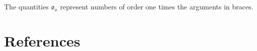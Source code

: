 \documentclass[preprint,12pt]{elsarticle}
\begin{document}
The quantities $\mathfrak{o}_x$ represent numbers of order one times the arguments in braces.

\newpage
\section*{References}


\end{document}

